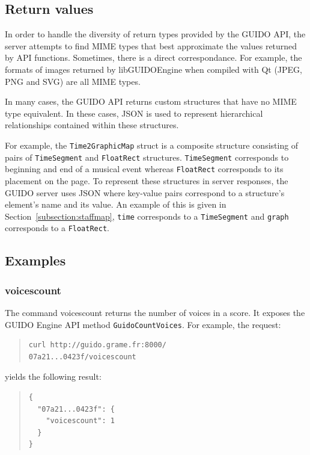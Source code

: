 \documentclass[11pt,a4paper]{article}
\newcommand{\guidosize}{7pt}
\begin{document}
\subsection{Return values}
In order to handle the diversity of return types provided by the GUIDO API, the server attempts to find MIME types that best approximate the values returned by API functions.  Sometimes, there is a direct correspondance.  For example, the formats of images returned by libGUIDOEngine when compiled with Qt (JPEG, PNG and SVG) are all MIME types.\par
In many cases, the GUIDO API returns custom structures that have no MIME type equivalent.  In these cases, JSON \cite{json} is used to represent hierarchical relationships contained within these structures.\par
For example, the \verb=Time2GraphicMap= struct is a composite structure consisting of pairs of \verb=TimeSegment= and \verb=FloatRect= structures.  \verb=TimeSegment= corresponds to beginning and end of a musical event whereas \verb=FloatRect= corresponds to its placement on the page.  To represent these structures in server responses, the GUIDO server uses JSON where key-value pairs correspond to a structure's element's name and its value. An example of this is given in Section~\ref{subsection:staffmap}, \verb=time= corresponds to a \verb=TimeSegment= and \verb=graph= corresponds to a \verb=FloatRect=.
\subsection{Examples}
\subsubsection{voicescount}
The command voicescount returns the number of voices in a score.  It exposes the GUIDO Engine API method \verb=GuidoCountVoices=.  For example, the request:
\begin{quote}
\begingroup
\fontsize{\guidosize}{12pt}\selectfont
\begin{verbatim}
curl http://guido.grame.fr:8000/
07a21...0423f/voicescount
\end{verbatim}
\endgroup
\end{quote}
yields the following result:
\begin{quote}
\begingroup
\fontsize{\guidosize}{12pt}\selectfont
\begin{verbatim}
{
  "07a21...0423f": {
    "voicescount": 1
  }
}
\end{verbatim}
\endgroup
\end{quote}
~
\end{document}
